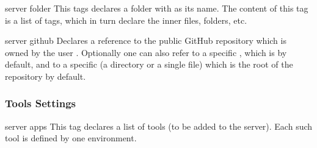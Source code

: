 \bigskip
\xmlstruct
{server}
{folder}
{%
%
  This tags declares a folder with  as its
  name. The content of this tag is a list of
   tags, which in turn declare the
  inner files, folders, etc.
%
}



\bigskip
\xmlstruct
{server}
{github}
{%
%
  Declares a reference to the public GitHub repository
   which is owned by the user
  . Optionally one can also refer to a specific
  , which is  by default, and to a
  specific  (a directory or a single file) which
  is the root of the repository by default.
%
}


\subsubsection{Tools Settings}

\bigskip
\xmlstruct
{server}
{apps}
{%
%
  This tag declares a list of tools (to be added to the
  server). Each such tool is defined by one 
  environment.  
%
} 


